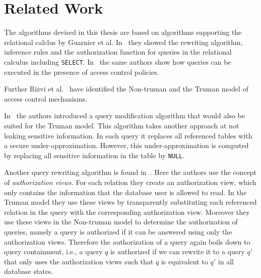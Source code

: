 \section{Related Work}

The algorithms devised in this thesis are based on algorithms supporting the relational calclus by Guarnier et al. In~\cite{guarnieri2016strong} they showed the rewriting algorithm, inference rules and the authorization function for queries in the relational calculus including \texttt{SELECT}.
%
In~\cite{guarnieri2014optimal} the same authors show how queries can be executed in the presence of access control policies.

Further Rizvi et al.~\cite{rizvi2004extending} have identified the Non-truman and the Truman model of access control mechanisms.

In~\cite{wang2007correctness} the authors introduced a query modification algorithm that would also be suited for the Truman model.
%
This algorithm takes another approach at not leaking sensitive information.
%
In each query it replaces all referenced tables with a secure under-approximation.
%
However, this under-approximation is computed by replacing all sensitive information in the table by \texttt{NULL}.

Another query rewriting algorithm is found in~\cite{rizvi2004extending}. 
%
Here the authors use the concept of \emph{authorization views}.
%
For each relation they create an authorization view, which only contains the information that the database user is allowed to read.
%
In the Truman model they use these views by transparently substituting each referenced relation in the query with the corresponding authorization view.
%
Moreover they use these views in the Non-truman model to determine the authorization of queries, namely a query is authorized if it can be answered using only the authorization views.
%
Therefore the authorization of a query again boils down to query containment, i.e., a query $q$ is authorized if we can rewrite it to a query $q'$ that only uses the authorization views such that $q$ is equivalent to $q'$ in all database states.